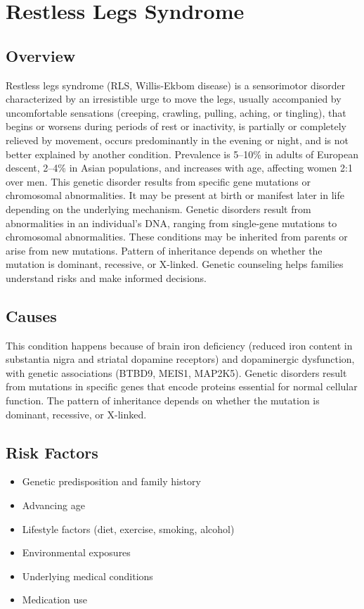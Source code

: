 \chapter{Restless Legs Syndrome}
\label{sec:Restless Legs Syndrome}

\section{Overview}
Restless legs syndrome (RLS, Willis-Ekbom disease) is a sensorimotor disorder characterized by an irresistible urge to move the legs, usually accompanied by uncomfortable sensations (creeping, crawling, pulling, aching, or tingling), that begins or worsens during periods of rest or inactivity, is partially or completely relieved by movement, occurs predominantly in the evening or night, and is not better explained by another condition. Prevalence is 5--10\% in adults of European descent, 2--4\% in Asian populations, and increases with age, affecting women 2:1 over men. This genetic disorder results from specific gene mutations or chromosomal abnormalities. It may be present at birth or manifest later in life depending on the underlying mechanism. Genetic disorders result from abnormalities in an individual's DNA, ranging from single-gene mutations to chromosomal abnormalities. These conditions may be inherited from parents or arise from new mutations. Pattern of inheritance depends on whether the mutation is dominant, recessive, or X-linked. Genetic counseling helps families understand risks and make informed decisions.
\section{Causes}
This condition happens because of brain iron deficiency (reduced iron content in substantia nigra and striatal dopamine receptors) and dopaminergic dysfunction, with genetic associations (BTBD9, MEIS1, MAP2K5). Genetic disorders result from mutations in specific genes that encode proteins essential for normal cellular function. The pattern of inheritance depends on whether the mutation is dominant, recessive, or X-linked.   
\section{Risk Factors}

\begin{itemize}[noitemsep]
  \item Genetic predisposition and family history
  \item Advancing age
  \item Lifestyle factors (diet, exercise, smoking, alcohol)
  \item Environmental exposures
  \item Underlying medical conditions
  \item Medication use
\end{itemize}
